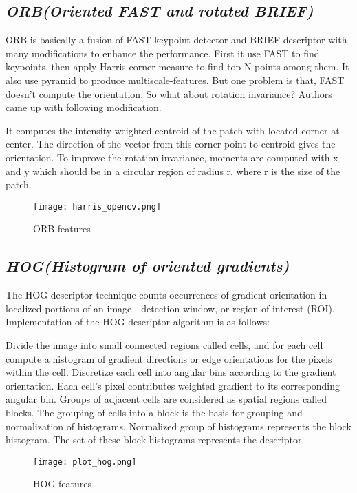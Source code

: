 	\subsection{\emph{ORB(Oriented FAST and rotated BRIEF)}}
	ORB is basically a fusion of FAST keypoint detector and BRIEF descriptor with many modifications to enhance the performance. First it use FAST to find keypoints, then apply Harris corner measure to find top N points among them. It also use pyramid to produce multiscale-features. But one problem is that, FAST doesn’t compute the orientation. So what about rotation invariance? Authors came up with following modification.
	
	It computes the intensity weighted centroid of the patch with located corner at center. The direction of the vector from this corner point to centroid gives the orientation. To improve the rotation invariance, moments are computed with x and y which should be in a circular region of radius r, where r is the size of the patch.
	\begin{figure}[htbp]
		\centering
		\texttt{[image: harris\_opencv.png]}
		\caption{ORB features\label{ORB features}}
	\end{figure}
	
	
	\subsection{\emph{HOG(Histogram of oriented gradients)}}
	The HOG descriptor technique counts occurrences of gradient orientation in localized portions of an image - detection window, or region of interest (ROI). Implementation of the HOG descriptor algorithm is as follows:
	
	Divide the image into small connected regions called cells, and for each cell compute a histogram of gradient directions or edge orientations for the pixels within the cell. Discretize each cell into angular bins according to the gradient orientation. Each cell's pixel contributes weighted gradient to its corresponding angular bin. Groups of adjacent cells are considered as spatial regions called blocks. The grouping of cells into a block is the basis for grouping and normalization of histograms. Normalized group of histograms represents the block histogram. The set of these block histograms represents the descriptor.
	\begin{figure}[htbp]
		\centering
		\texttt{[image: plot\_hog.png]}
		\caption{HOG features\label{HOG features}}
	\end{figure}
	
